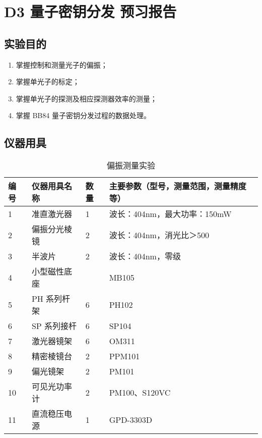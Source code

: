 \documentclass[dvipsnames, svgnames,a4paper,11pt]{article}
\begin{document}
\clearpage
\tableofcontents
\clearpage

\setcounter{section}{0}
\section{D3 \quad 量子密钥分发 \quad\heiti 预习报告}
	
\subsection{实验目的}
\begin{enumerate}
	\item 掌握控制和测量光子的偏振；
	\item 掌握单光子的标定；
	\item 掌握单光子的探测及相应探测器效率的测量；
	\item 掌握 BB84 量子密钥分发过程的数据处理。
	
\end{enumerate}

\subsection{仪器用具}
\begin{table}[htbp]
	\centering
	\renewcommand\arraystretch{1.6}
	\caption{偏振测量实验}
	\begin{tabular}{p{}|p{}|p{}|p{}}
		\hline
		编号& 仪器用具名称 & 数量 &  主要参数（型号，测量范围，测量精度等） \\
		\hline
		1	&	准直激光器 	& 1 & 波长：404nm，最大功率：150mW\\

		2	&	偏振分光棱镜 	& 2 & 波长：404nm，消光比＞500	 \\
		
		3	&	半波片 & 2 &	波长：404nm，零级 	\\
		
		4	&	小型磁性底座	&  & MB105	\\
		
		5	&	PH 系列杆架	& 6 & PH102	\\

		6	&	SP 系列接杆	& 6 & SP104 \\

		7	&	激光器镜架	& 6 & OM311	\\

		8	&	精密棱镜台	& 2 & PPM101	\\

		9	&	偏光镜架	& 2 & PM101	\\

		10	&	可见光功率计& 2 & PM100、S120VC	\\

		11	&	直流稳压电源& 1 & GPD-3303D	\\
		\hline
	\end{tabular}
	\label{tbl:偏振测量实验}
\end{table}
\end{document}
